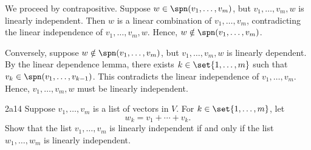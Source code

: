 \begin{soliff}
    \rightimp We proceed by contrapositive.
    Suppose $w \in \spn(v_1, \ldots, v_m)$, but $v_1, \ldots, v_m, w$ is linearly independent.
    Then $w$ is a linear combination of $v_1, \ldots, v_m$, contradicting the linear independence of $v_1, \ldots, v_m, w$.
    Hence, $w \notin \spn(v_1, \ldots, v_m)$.

    \leftimp Conversely, suppose $w \notin \spn(v_1, \ldots, v_m)$, but $v_1, \ldots, v_m, w$ is linearly dependent.
    By the linear dependence lemma, there exists $k \in \set{1, \ldots, m}$ such that $v_k \in \spn(v_1, \ldots, v_{k - 1})$.
    This contradicts the linear independence of $v_1, \ldots, v_m$.
    Hence, $v_1, \ldots, v_m, w$ must be linearly independent.
\end{soliff}
 
\begin{exercise}{2a14}
    Suppose $v_1, \ldots, v_m$ is a list of vectors in $V$.
	For $k \in \set{1, \ldots, m}$, let
    \[
    	w_k = v_1 + \cdots + v_k.
    \]
    Show that the list $v_1, \ldots, v_m$ is linearly independent if and only if the list $w_1, \ldots, w_m$ is linearly independent.
\end{exercise}

